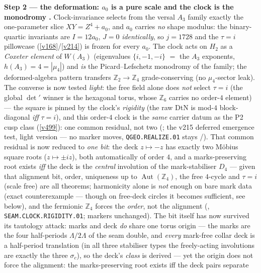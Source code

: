 \documentclass[11pt,a4paper]{article}
\newcommand{\Z}{\mathbb{Z}}
\theoremstyle{definition}
\begin{document}
\par\smallskip\noindent\textbf{Step 2 --- the deformation: $a_0$ is a pure scale and the clock is the
monodromy \mE.} Clock-invariance selects from the
versal $A_3$ family exactly the one-parameter slice $XY=Z^4{+}a_0$, and $a_0$ carries \emph{no} shape
modulus: the binary-quartic invariants are $I=12a_0$, $J=0$ \emph{identically}, so $j=1728$ and the
$\tau{=}i$ pillowcase (\vref{v168}/\vref{v214}) is frozen for every $a_0$. The clock acts on $H_2$ as a
\emph{Coxeter element} of $W(A_3)$ (eigenvalues $\{i,-1,-i\}$ $=$ the $A_3$ exponents,
$h(A_3){=}4{=}|\mu_4|$) and \emph{is} the Picard--Lefschetz monodromy of the family; the deformed-algebra
pattern transfers $\Z_2\to\Z_4$ grade-conserving (no $\mu_4$-sector leak).
 The converse is now tested \emph{light}: the free
field alone does \emph{not} select $\tau=i$ (the global $\det{}'$ winner is the hexagonal torus, whose
$\Z_6$ carries no order-$4$ element) --- the square is pinned by the clock's \emph{rigidity} (the raw
DtN is mod-$4$ block-diagonal \emph{iff} $\tau=i$), and this order-$4$ clock is the \emph{same} carrier
datum as the P2 cusp class (\vref{v499}): one common residual, not two
(; the v215 deferred emergence test, light version --- no marker
moves, \texttt{QGEO.REALIZE.01} stays \mC/\mO). That common residual is now reduced to \emph{one bit}:
the deck $z\mapsto-z$ has exactly two M\"obius square roots ($z\mapsto\pm iz$), both automatically of
order $4$, and a marks-preserving root exists \emph{iff} the deck is the \emph{central} involution of
the mark-stabiliser $D_4$ --- given that alignment bit, order, uniqueness up to $\operatorname{Aut}(\Z_4)$,
the free $4$-cycle and $\tau=i$ (scale free) are all theorems; harmonicity alone is \emph{not} enough
on bare mark data (exact counterexample --- though on free-deck circles it becomes sufficient, see
below), and the fermionic $\Z_4$ forces the \emph{order}, not the alignment
(, \texttt{SEAM.CLOCK.RIGIDITY.01}; markers unchanged). The bit
itself has now survived its tautology attack: marks and deck \emph{do} share one torus origin ---
the marks are the four half-periods $\Lambda/2\Lambda$ of the seam double, and \emph{every}
mark-free collar deck is a half-period translation (in all three stabiliser types the freely-acting
involutions are exactly the three $\sigma_c$), so the deck's \emph{class} is derived --- yet the
origin does not force the alignment: the marks-preserving root exists iff the deck pairs separate
\end{document}
